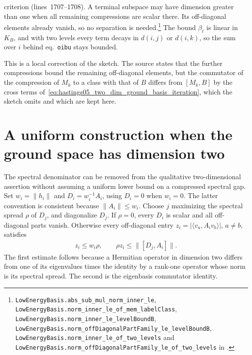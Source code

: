 \documentclass{article}
\providecommand{\leanid}[1]{\nolinkurl{#1}}
\begin{document}
criterion (lines~1707--1708). A terminal subspace may have dimension greater than
one when all remaining compressions are scalar there. Its off-diagonal elements
already vanish, so no separation is needed.\footnote{\leanid{LowEnergyBasis.abs_sub_mul_norm_inner_le},
    \leanid{LowEnergyBasis.norm_inner_le_of_mem_labelClass},
    \leanid{LowEnergyBasis.norm_inner_le_levelBoundB},
    \leanid{LowEnergyBasis.norm_offDiagonalPartFamily_le_levelBoundB},
    \leanid{LowEnergyBasis.norm_inner_le_of_two_levels} and
    \leanid{LowEnergyBasis.norm_offDiagonalPartFamily_le_of_two_levels} in
    .}
The bound $\beta_\ell$ is linear in $K_B$, and with two levels every term decays
in $d(i,j)$ or $d(i,k)$, so the sum over $i$ behind eq.~\texttt{oibu} stays
bounded.

This is a local correction of the sketch. The source states that the further
compressions bound the remaining off-diagonal elements, but the commutator of
the compression of $M_k$ to a class with that of $B$ differs from $[M_k,B]$ by
the cross terms of~\eqref{eq:hastings05_two_dim_ground_basis_iteration}, which
the sketch omits and which are kept here.


\section{A uniform construction when the ground space has dimension two}

The spectral denominator can be removed from the qualitative two-dimensional
assertion without assuming a uniform lower bound on a compressed spectral gap.
Set $w_i=\|h_i\|$ and $D_i=w_i^{-1}A_i$, using $D_i=0$ when $w_i=0$.
The latter convention is consistent because $\|A_i\|\le w_i$.
Choose $j$ maximizing the spectral spread $\rho$ of $D_j$, and diagonalize $D_j$.
If $\rho=0$, every $D_i$ is scalar and all off-diagonal parts vanish.
Otherwise every off-diagonal entry $z_i=|\langle v_a,A_iv_b\rangle|$, $a\ne b$,
satisfies
\begin{align}
 z_i\le w_i\rho,
 \qquad \rho z_i\le \|[D_j,A_i]\|.
 \label{eq:hastings05_basis_normalized_bounds}
\end{align}
The first estimate follows because a Hermitian operator in dimension two differs
from one of its eigenvalues times the identity by a rank-one operator whose norm
is its spectral spread. The second is the eigenbasis commutator identity.
\end{document}
